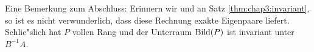 Eine Bemerkung zum Abschluss: Erinnern wir und an Satz \ref{thm:chap3:invariant}, so ist es nicht verwunderlich, dass diese Rechnung
exakte Eigenpaare liefert. Schlie"slich hat $P$
vollen Rang und der Unterraum $\operatorname{Bild}(P)$ ist invariant unter $B^{-1}A$.




